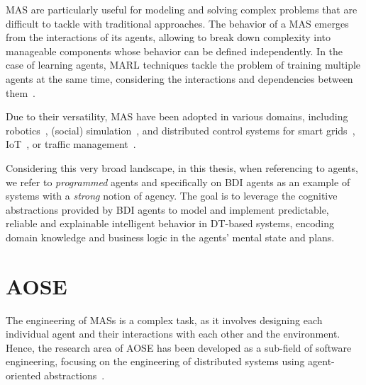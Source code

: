 \ac{MAS} are particularly useful for modeling and solving complex problems that are difficult to tackle with traditional approaches.
%
The behavior of a \ac{MAS} emerges from the interactions of its agents, allowing to break down complexity into manageable components whose behavior can be defined independently.
%
In the case of learning agents, \ac{MARL} techniques tackle the problem of training multiple agents at the same time, considering the interactions and dependencies between them~\cite{Albrecht_Christianos_Schäfer_2024}.


Due to their versatility, \ac{MAS} have been adopted in various domains, including robotics~\cite{Vicente-Diaz_2012}, (social) simulation~\cite{Uhrmacher_Weyns_2018,Davidsson_2001}, and distributed control systems for smart grids~\cite{Merabet_Essaaidi_Talei_Abid_Khalil_Madkour_Benhaddou_2014}, \ac{IoT}~\cite{Singh_Chopra_2017}, or traffic management~\cite{Torabi_Wenkstern_Saylor_2020}.

Considering this very broad landscape, in this thesis, when referencing to agents,  we refer to \emph{programmed} agents and specifically on \ac{BDI} agents as an example of systems with a \emph{strong} notion of agency.
%
The goal is to leverage the cognitive abstractions provided by \ac{BDI} agents to model and implement predictable, reliable and explainable intelligent behavior in \ac{DT}-based systems, encoding domain knowledge and business logic in the agents' mental state and plans.

\section{\acl{AOSE}}

The engineering of \acp{MAS} is a complex task, as it involves designing each individual agent and their interactions with each other and the environment.
%
Hence, the research area of \ac{AOSE} has been developed as a sub-field of software engineering, focusing on the engineering of distributed systems using agent-oriented abstractions~\cite{Jennings_1999,Wooldridgey_Ciancarini_2001}.

